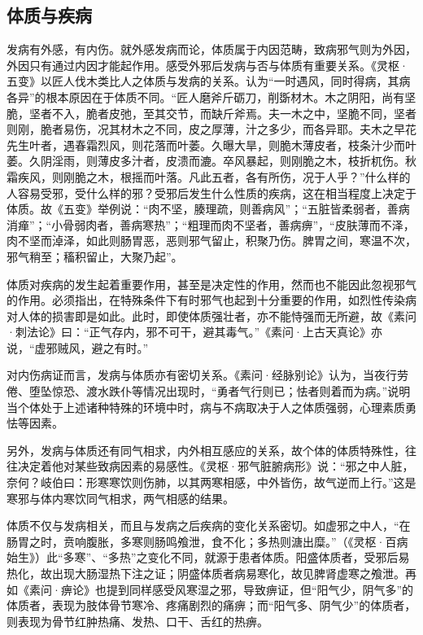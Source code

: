 \documentclass[draft,12pt]{ctexbook}
\begin{document}
\subsection{体质与疾病}%

发病有外感，有内伤。就外感发病而论，体质属于内因范畴，致病邪气则为外因，外因只有通过内因才能起作用。感受外邪后发病与否与体质有重要关系。《灵枢·五变》以匠人伐木类比人之体质与发病的关系。认为“一时遇风，同时得病，其病各异”的根本原因在于体质不同。“匠人磨斧斤砺刀，削斲材木。木之阴阳，尚有坚脆，坚者不入，脆者皮弛，至其交节，而缺斤斧焉。夫一木之中，坚脆不同，坚者则刚，脆者易伤，况其材木之不同，皮之厚薄，汁之多少，而各异耶。夫木之早花先生叶者，遇春霜烈风，则花落而叶萎。久曝大旱，则脆木薄皮者，枝条汁少而叶萎。久阴淫雨，则薄皮多汁者，皮溃而漉。卒风暴起，则刚脆之木，枝折杌伤。秋霜疾风，则刚脆之木，根摇而叶落。凡此五者，各有所伤，况于人乎？”什么样的人容易受邪，受什么样的邪？受邪后发生什么性质的疾病，这在相当程度上决定于体质。故《五变》举例说：“肉不坚，腠理疏，则善病风”；“五脏皆柔弱者，善病消瘅”；“小骨弱肉者，善病寒热”；“粗理而肉不坚者，善病痹”，“皮肤薄而不泽，肉不坚而淖泽，如此则肠胃恶，恶则邪气留止，积聚乃伤。脾胃之间，寒温不次，邪气稍至；稸积留止，大聚乃起”。

体质对疾病的发生起着重要作用，甚至是决定性的作用，然而也不能因此忽视邪气的作用。必须指出，在特殊条件下有时邪气也起到十分重要的作用，如烈性传染病对人体的损害即是如此。此时，即使体质强壮者，亦不能恃强而无所避，故《素问·刺法论》曰：“正气存内，邪不可干，避其毒气。”《素问·上古天真论》亦说，“虚邪贼风，避之有时。”

对内伤病证而言，发病与体质亦有密切关系。《素问·经脉别论》认为，当夜行劳倦、堕坠惊恐、渡水跌仆等情况出现时，“勇者气行则已；怯者则着而为病。”说明当个体处于上述诸种特殊的环境中时，病与不病取决于人之体质强弱，心理素质勇怯等因素。

另外，发病与体质还有同气相求，内外相互感应的关系，故个体的体质特殊性，往往决定着他对某些致病因素的易感性。《灵枢·邪气脏腑病形》说：“邪之中人脏，奈何？岐伯曰：形寒寒饮则伤肺，以其两寒相感，中外皆伤，故气逆而上行。”这是寒邪与体内寒饮同气相求，两气相感的结果。

体质不仅与发病相关，而且与发病之后疾病的变化关系密切。如虚邪之中人，“在肠胃之时，贲响腹胀，多寒则肠鸣飧泄，食不化；多热则溏出糜。”（《灵枢·百病始生》）此“多寒”、“多热”之变化不同，就源于患者体质。阳盛体质者，受邪后易热化，故出现大肠湿热下注之证；阴盛体质者病易寒化，故见脾肾虚寒之飧泄。再如《素问·痹论》也提到同样感受风寒湿之邪，导致痹证，但“阳气少，阴气多”的体质者，表现为肢体骨节寒冷、疼痛剧烈的痛痹；而“阳气多、阴气少”的体质者，则表现为骨节红肿热痛、发热、口干、舌红的热痹。
\end{document}
